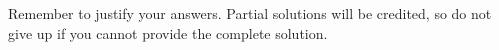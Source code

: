\documentclass[twoside,12pt]{article}
\begin{document}
{}

Remember to justify your answers. Partial solutions will be credited, so do not
give up if you cannot provide the complete solution.


\end{document}
